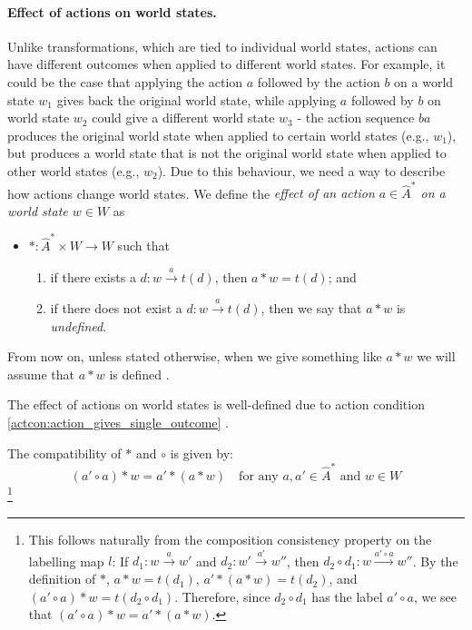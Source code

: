 \paragraph{Effect of actions on world states.}
Unlike transformations, which are tied to individual world states, actions can have different outcomes when applied to different world states.
For example, it could be the case that applying the action $a$ followed by the action $b$ on a world state $w_{1}$ gives back the original world state, while applying $a$ followed by $b$ on world state $w_{2}$ could give a different world state $w_{3}$ - the action sequence $ba$ produces the original world state when applied to certain world states (e.g., $w_{1}$), but produces a world state that is not the original world state when applied to other world states (e.g., $w_{2}$).
Due to this behaviour, we need a way to describe how actions change world states.
We define the \emph{effect of an action $a \in \hat{A}^{\ast}$ on a world state $w \in W$} as

\begin{itemize}
	\item[] $\ast: \hat{A}^{\ast} \times W \to W$ such that
	      \begin{enumerate}[(1)]
		      \item if there exists a $d: w \xrightarrow{a} t(d)$, then $a \ast w = t(d)$; and
		      \item if there does not exist a $d: w \xrightarrow{a} t(d)$, then we say that $a \ast w$ is \emph{undefined}.
	      \end{enumerate}
\end{itemize}
From now on, unless stated otherwise, when we give something like $a \ast w$ we will assume that $a \ast w$ is defined .


The effect of actions on world states is well-defined due to action condition \ref{actcon:action_gives_single_outcome} .

The compatibility of $\ast$ and $\circ$ is given by:
\begin{equation}\label{eqn:circ_ast_compatibility}
    (a' \circ a) \ast w = a' \ast (a \ast w) \quad \text{for any $a, a' \in \hat{A}^{\ast}$ and $w \in W$}
\end{equation}
\footnote{
This follows naturally from the composition consistency property on the labelling map $l$:
If $d_{1}: w \xrightarrow{a} w'$ and $d_{2}: w' \xrightarrow{a'} w''$, then $d_{2} \circ d_{1}: w \xrightarrow{a' \circ a} w''$.
By the definition of $\ast$, $a * w = t(d_{1})$, $a' \ast (a \ast w) = t(d_{2})$, and $(a' \circ a) \ast w = t(d_{2} \circ d_{1})$.
Therefore, since $d_{2} \circ d_{1}$ has the label $a' \circ a$, we see that $(a' \circ a) \ast w = a' \ast (a \ast w)$.
}

